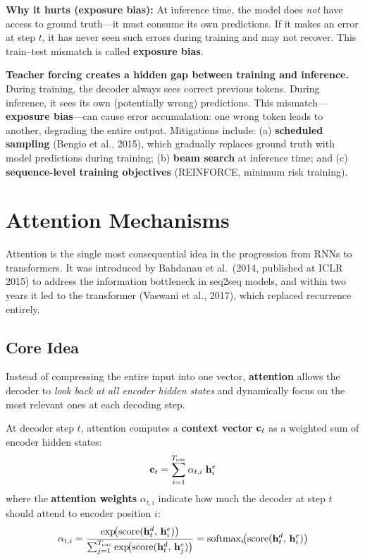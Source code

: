 \textbf{Why it hurts (exposure bias):} At inference time, the model does
\emph{not} have access to ground truth---it must consume its own
predictions.  If it makes an error at step $t$, it has never seen such
errors during training and may not recover.  This train--test mismatch is
called \textbf{exposure bias}.

\begin{warningbox}
\textbf{Teacher forcing creates a hidden gap between training and
inference.}  During training, the decoder always sees correct previous
tokens.  During inference, it sees its own (potentially wrong) predictions.
This mismatch---\textbf{exposure bias}---can cause error accumulation:
one wrong token leads to another, degrading the entire output.  Mitigations
include: (a) \textbf{scheduled sampling} (Bengio et al., 2015), which
gradually replaces ground truth with model predictions during training;
(b) \textbf{beam search} at inference time; and (c) \textbf{sequence-level
training objectives} (REINFORCE, minimum risk training).
\end{warningbox}


\section{Attention Mechanisms}
\label{sec:attention}

Attention is the single most consequential idea in the progression from
RNNs to transformers.  It was introduced by Bahdanau et al.\ (2014,
published at ICLR 2015) to
address the information bottleneck in seq2seq models, and within two years
it led to the transformer (Vaswani et al., 2017), which replaced recurrence
entirely.

\subsection{Core Idea}

Instead of compressing the entire input into one vector, \textbf{attention}
allows the decoder to \emph{look back at all encoder hidden states} and
dynamically focus on the most relevant ones at each decoding step.

At decoder step $t$, attention computes a \textbf{context vector}
$\mathbf{c}_t$ as a weighted sum of encoder hidden states:
\begin{equation}
\mathbf{c}_t = \sum_{i=1}^{T_{\text{enc}}} \alpha_{t,i} \;\mathbf{h}_i^e
\label{eq:context_vec}
\end{equation}
where the \textbf{attention weights} $\alpha_{t,i}$ indicate how much the
decoder at step $t$ should attend to encoder position $i$:
\begin{equation}
\alpha_{t,i}
= \frac{\exp\!\bigl(\text{score}(\mathbf{h}_t^d,\, \mathbf{h}_i^e)\bigr)}
       {\sum_{j=1}^{T_{\text{enc}}}
        \exp\!\bigl(\text{score}(\mathbf{h}_t^d,\, \mathbf{h}_j^e)\bigr)}
= \operatorname{softmax}_i\!\bigl(\text{score}(\mathbf{h}_t^d,\, \mathbf{h}_i^e)\bigr)
\label{eq:attn_weights}
\end{equation}

